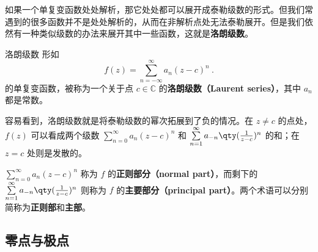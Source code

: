 

如果一个单复变函数处处解析，那它处处都可以展开成泰勒级数的形式。但我们常遇到的很多函数并不是处处解析的，从而在非解析点处无法泰勒展开。但是我们依然有一种类似级数的办法来展开其中一些函数，这就是\textbf{洛朗级数}。

\begin{definition}{洛朗级数}
形如
\begin{equation}
f(z)=\sum\limits_{n=-\infty}^{\infty} a_n(z-c)^n~.
\end{equation}
的单复变函数，被称为一个关于点 $c\in\mathbb{C}$ 的\textbf{洛朗级数（Laurent series）}，其中 $a_n$ 都是常数。


\end{definition}

容易看到，洛朗级数就是将泰勒级数的幂次拓展到了负的情况。在 $z\neq c$ 的点处，$f(z)$ 可以看成两个级数 $\sum\limits_{n=0}^{\infty} a_n(z-c)^n$ 和 $\sum\limits_{n=1}^{\infty} a_{-n}\qty(\frac{1}{z-c})^n$ 的和；在 $z=c$ 处则是发散的。

$\sum\limits_{n=0}^{\infty} a_n(z-c)^n$ 称为 $f$ 的\textbf{正则部分（normal part）}，而剩下的 $\sum\limits_{n=1}^{\infty} a_{-n}\qty(\frac{1}{z-c})^n$ 则称为 $f$ 的\textbf{主要部分（principal part）}。两个术语可以分别简称为\textbf{正则部}和\textbf{主部}。



\subsection{零点与极点}


















